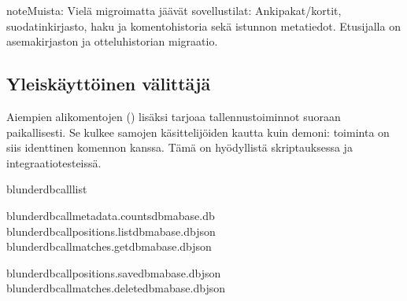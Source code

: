 \documentclass[letterpaper,10pt,finnish]{sphinxmanual}
\begin{document}
\begin{sphinxadmonition}{note}{Muista:}
\sphinxAtStartPar
Vielä migroimatta jäävät sovellustilat: Anki\sphinxhyphen{}pakat/\sphinxhyphen{}kortit, suodatinkirjasto, haku\sphinxhyphen{} ja komentohistoria sekä istunnon metatiedot. Etusijalla on asemakirjaston ja otteluhistorian migraatio.
\end{sphinxadmonition}


\subsection{Yleiskäyttöinen \sphinxhyphen{}välittäjä}
\label{\detokenize{mode_headless:le-dispatcher-generique-call}}\label{\detokenize{mode_headless:headless-call}}
\sphinxAtStartPar
Aiempien alikomentojen ({\hyperref[\detokenize{cli:cli}]{}}) lisäksi  tarjoaa  tallennustoiminnot suoraan paikallisesti. Se kulkee samojen käsittelijöiden kautta kuin \sphinxhyphen{}demoni: toiminta on siis identtinen komennon  kanssa. Tämä on hyödyllistä skriptauksessa ja integraatiotesteissä.

\begin{sphinxVerbatim}[commandchars=\\\{\}]
blunderdbcall\PYGZhy{}\PYGZhy{}list

blunderdbcallmetadata.counts\PYGZhy{}\PYGZhy{}dbma\PYGZus{}base.db
blunderdbcallpositions.list\PYGZhy{}\PYGZhy{}dbma\PYGZus{}base.db\PYGZhy{}\PYGZhy{}json
blunderdbcallmatches.get\PYGZhy{}\PYGZhy{}dbma\PYGZus{}base.db\PYGZhy{}\PYGZhy{}json

blunderdbcallpositions.save\PYGZhy{}\PYGZhy{}dbma\PYGZus{}base.db\PYGZhy{}\PYGZhy{}json
blunderdbcallmatches.delete\PYGZhy{}\PYGZhy{}dbma\PYGZus{}base.db\PYGZhy{}\PYGZhy{}json
\end{sphinxVerbatim}
\end{document}
